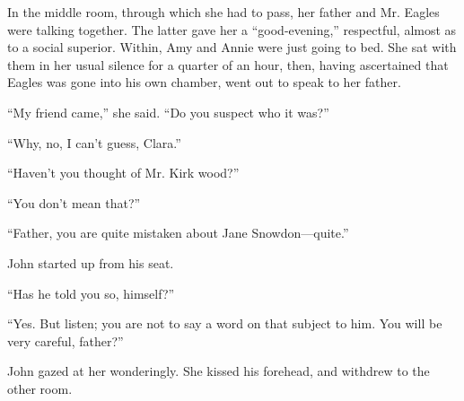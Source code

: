 In the middle room, through which she had to pass, her father and Mr.
Eagles were talking together. The latter gave her a ``good-evening,''
respectful, almost as to a social {}superior. Within, Amy and Annie were
just going to bed. She sat with them in her usual silence for a quarter
of an hour, then, having ascertained that Eagles was gone into his own
chamber, went out to speak to her father.

``My friend came,'' she said. ``Do you suspect who it was?''

``Why, no, I can't guess, Clara.''

``Haven't you thought of Mr. Kirk wood?''

``You don't mean that?''

``Father, you are quite mistaken about Jane Snowdon---quite.''

John started up from his seat.

``Has he told you so, himself?''

``Yes. But listen; you are not to say a word on that subject to him. You
will be very careful, father?''

John gazed at her wonderingly. She kissed his forehead, and withdrew to
the other room.
